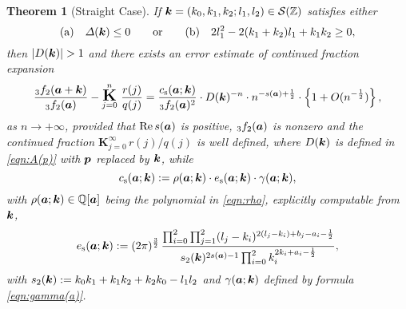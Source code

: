 \documentclass[a4paper,12pt]{article}
\theoremstyle{plain}
\newtheorem{theorem}{Theorem}[section]
\def\rs{\mathrm{s}}
\def\rRe{\mathrm{Re}}
\def\Q{\mathbb{Q}}
\def\Z{\mathbb{Z}}
\def\cS{\mathcal{S}}
\def\vD{\varDelta}
\def\ba{\mbox{\boldmath $a$}}
\def\sba{\mbox{\boldmath ${\scriptstyle a}$}}
\def\bk{\mbox{\boldmath $k$}}
\def\bp{\mbox{\boldmath $p$}}
\def\cfL{\mbox{\Large \boldmath $\mathrm{K}$}}
\begin{document}
\begin{theorem}[Straight Case] \label{thm:cf-straight}  
If $\bk = (k_0, k_1, k_2; l_1, l_2) \in \cS(\Z)$ satisfies either 
\begin{equation} \label{eqn:cond-straight}
(\mathrm{a}) \quad  \vD(\bk) \le 0 \qquad \mbox{or} \qquad 
(\mathrm{b}) \quad 2 l_1^2 - 2(k_1 + k_2) l_1 + k_1 k_2 \ge 0, 
\end{equation}
then  $|D(\bk)| > 1$ and there exists an error estimate of continued fraction 
expansion  
\begin{equation} \label{eqn:cf-straight}
\frac{{}_3f_2(\ba+\bk)}{{}_3f_2(\ba)} - 
\overset{n}{\underset{j=0}{\cfL}} \,\, \frac{r(j)}{q(j)} 
= \dfrac{ c_{\rs}(\ba; \bk) }{{}_3f_2(\ba)^2}  
\cdot D(\bk)^{-n} \cdot n^{-s(\sba) + \frac{1}{2} } \cdot 
\left\{ 1 + O (n^{-\frac{1}{2} } ) \right\},  
\end{equation} 
as $n \to + \infty$, provided that $\rRe \, s(\ba)$ is positive, ${}_3f_2(\ba)$ is 
nonzero and the continued fraction $\mathbf{K}_{j=0}^{\infty} \, r(j)/q(j)$ is well 
defined,  where $D(\bk)$ is defined in \eqref{eqn:A(p)} with $\bp$ 
replaced by $\bk$, while 
\begin{equation*}   
c_{\rs}(\ba; \bk) := \rho(\ba; \bk) \cdot e_{\rs}(\ba; \bk) \cdot \gamma(\ba; \bk), 
\end{equation*} 
with $\rho(\ba; \bk) \in \Q[\ba]$ being the polynomial in \eqref{eqn:rho}, 
explicitly computable from $\bk$, 
\begin{equation} \label{eqn:es(a;k)} 
e_{\rs}(\ba; \bk) 
:= (2\pi)^{ \frac{3}{2} } \, 
\dfrac{ \prod_{i=0}^2 \prod_{j=1}^2 
(l_j-k_i)^{2(l_j-k_i)+b_j-a_i- \frac{1}{2} } }{ s_2(\bk)^{2 s(\sba)-1} 
\prod_{i=0}^2 k_i^{2 k_i + a_i - \frac{1}{2} } },  
\end{equation}
with $s_2(\bk) := k_0 k_1 + k_1 k_2 + k_2 k_0 - l_1 l_2$ and $\gamma(\ba; \bk)$ 
defined by formula \eqref{eqn:gamma(a)}.  
\end{theorem}
\par
\end{document}
